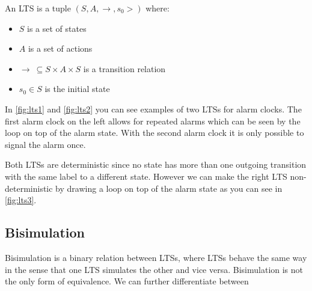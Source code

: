 \documentclass{clseminar}
\begin{document}
  An LTS is a tuple $(S, A, \to,s_0>)$ where: \\

  \begin{itemize}[noitemsep]
    \item $S$ is a set of states \\
    \item $A$ is a set of actions \\
    \item $\to\ \subseteq S \times A \times S$ is a transition relation \\
    \item $s_0 \in S$ is the initial state \\
  \end{itemize}

  \begin{figure}[!ht]
    \begin{minipage}{.5\linewidth}
      \centering
      
      \label{fig:lts1}
    \end{minipage}
    \begin{minipage}{.5\linewidth}
      \centering
      
      \label{fig:lts2}
    \end{minipage}
  \end{figure}

  In \autoref{fig:lts1} and \autoref{fig:lts2} you can see examples of two LTSs for alarm clocks. The first alarm clock on the left allows for repeated alarms which can be seen by the loop on top of the alarm state. With the second alarm clock it is only possible to signal the alarm once.

  Both LTSs are deterministic since no state has more than one outgoing transition with the same label to a different state. However we can make the right LTS non-deterministic by drawing a loop on top of the alarm state as you can see in \autoref{fig:lts3}. \\

  \begin{figure}[!ht]
    \centering
    
    \caption{}
    \label{fig:lts3}
  \end{figure}

  \subsection{Bisimulation}
  Bisimulation is a binary relation between LTSs, where LTSs behave the same way in the sense
  that one LTS simulates the other and vice versa. \cite{bisimulation_wiki} Bisimulation is not the only form of equivalence. We can further differentiate between
\end{document}
